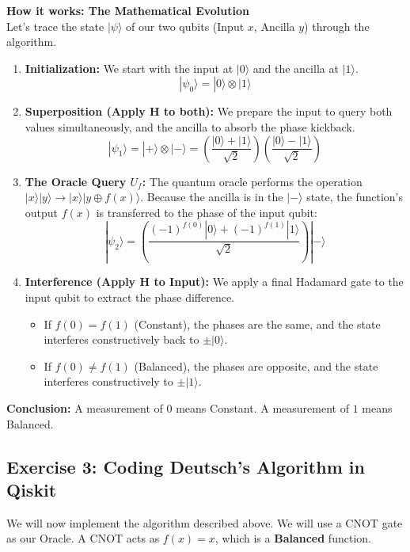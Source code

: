 \documentclass[a4paper,11pt]{article}
\begin{document}
\begin{mathbox}
\textbf{How it works: The Mathematical Evolution}\\
Let's trace the state $|\psi\rangle$ of our two qubits (Input $x$, Ancilla $y$) through the algorithm.
\begin{enumerate}
    \item \textbf{Initialization:} We start with the input at $|0\rangle$ and the ancilla at $|1\rangle$.
    $$|\psi_0\rangle = |0\rangle \otimes |1\rangle$$
    
    \item \textbf{Superposition (Apply H to both):} We prepare the input to query both values simultaneously, and the ancilla to absorb the phase kickback.
    $$|\psi_1\rangle = |+\rangle \otimes |-\rangle = \left( \frac{|0\rangle + |1\rangle}{\sqrt{2}} \right) \left( \frac{|0\rangle - |1\rangle}{\sqrt{2}} \right)$$
    
    \item \textbf{The Oracle Query $U_f$:} The quantum oracle performs the operation $|x\rangle|y\rangle \to |x\rangle|y \oplus f(x)\rangle$. Because the ancilla is in the $|-\rangle$ state, the function's output $f(x)$ is transferred to the phase of the input qubit:
    $$|\psi_2\rangle = \left( \frac{(-1)^{f(0)}|0\rangle + (-1)^{f(1)}|1\rangle}{\sqrt{2}} \right) |-\rangle$$
    
    \item \textbf{Interference (Apply H to Input):} We apply a final Hadamard gate to the input qubit to extract the phase difference.
    \begin{itemize}
        \item If $f(0) = f(1)$ (Constant), the phases are the same, and the state interferes constructively back to $\pm|0\rangle$.
        \item If $f(0) \neq f(1)$ (Balanced), the phases are opposite, and the state interferes constructively to $\pm|1\rangle$.
    \end{itemize}
\end{enumerate}
\textbf{Conclusion:} A measurement of $0$ means Constant. A measurement of $1$ means Balanced.
\end{mathbox}

\newpage

\subsection{Exercise 3: Coding Deutsch's Algorithm in Qiskit}
We will now implement the algorithm described above. We will use a CNOT gate as our Oracle. A CNOT acts as $f(x) = x$, which is a \textbf{Balanced} function.
\end{document}
